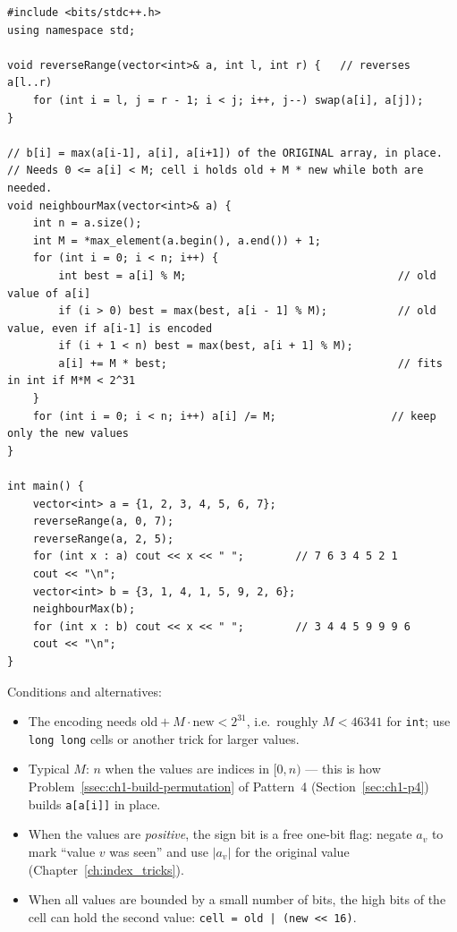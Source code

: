 \begin{lstlisting}[style=cpp]
#include <bits/stdc++.h>
using namespace std;

void reverseRange(vector<int>& a, int l, int r) {   // reverses a[l..r)
    for (int i = l, j = r - 1; i < j; i++, j--) swap(a[i], a[j]);
}

// b[i] = max(a[i-1], a[i], a[i+1]) of the ORIGINAL array, in place.
// Needs 0 <= a[i] < M; cell i holds old + M * new while both are needed.
void neighbourMax(vector<int>& a) {
    int n = a.size();
    int M = *max_element(a.begin(), a.end()) + 1;
    for (int i = 0; i < n; i++) {
        int best = a[i] % M;                                 // old value of a[i]
        if (i > 0) best = max(best, a[i - 1] % M);           // old value, even if a[i-1] is encoded
        if (i + 1 < n) best = max(best, a[i + 1] % M);
        a[i] += M * best;                                    // fits in int if M*M < 2^31
    }
    for (int i = 0; i < n; i++) a[i] /= M;                  // keep only the new values
}

int main() {
    vector<int> a = {1, 2, 3, 4, 5, 6, 7};
    reverseRange(a, 0, 7);
    reverseRange(a, 2, 5);
    for (int x : a) cout << x << " ";        // 7 6 3 4 5 2 1
    cout << "\n";
    vector<int> b = {3, 1, 4, 1, 5, 9, 2, 6};
    neighbourMax(b);
    for (int x : b) cout << x << " ";        // 3 4 4 5 9 9 9 6
    cout << "\n";
}
\end{lstlisting}

Conditions and alternatives:
\begin{itemize}[leftmargin=*]
    \item The encoding needs $\text{old} + M \cdot \text{new} < 2^{31}$, i.e.\ roughly $M < 46341$ for \texttt{int}; use \texttt{long long} cells or another trick for larger values.
    \item Typical $M$: $n$ when the values are indices in $[0, n)$ --- this is how Problem~\ref{ssec:ch1-build-permutation} of Pattern~4 (Section~\ref{sec:ch1-p4}) builds \texttt{a[a[i]]} in place.
    \item When the values are \emph{positive}, the sign bit is a free one-bit flag: negate $a_v$ to mark ``value $v$ was seen'' and use $|a_v|$ for the original value (Chapter~\ref{ch:index_tricks}).
    \item When all values are bounded by a small number of bits, the high bits of the cell can hold the second value: \texttt{cell = old | (new << 16)}.
\end{itemize}

